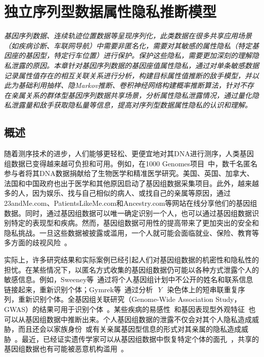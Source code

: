 \chapter{独立序列型数据属性隐私推断模型}
\label{chap:inference-attack-on-norelated-sequenced-data}

\textit{ }

\textit{基因序列数据、连续轨迹位置数据等呈现序列化，此类数据在很多共享应用场景（如疾病诊断、车联网导航）中需要非匿名化，需要对其敏感的属性隐私（特定基因座的基因型，特定行车位置）进行保护。保护这些隐私，需要更加深刻的理解隐私泄露的原因。本章针对基因序列数据的基因座值属性隐私，通过对单条敏感数据记录属性值存在的相互关联关系进行分析，构建目标属性值推断的敌手模型，并以此为基础利用抽样、隐Markov推断、卷积神经网络构建概率推断算法，针对不存在亲属关系的群体型基因序列数据共享场景，分析属性隐私泄露情况，通过量化隐私泄露量和敌手获取隐私量等信息，提高对序列型数据属性隐私的认识和理解。
}

\section{概述}\label{sec:intro}

随着测序技术的进步，人们能够更轻松、更便宜地对其DNA进行测序，人类基因组数据已变得越来越可负担和可用。例如，在1000 Genomes项目~\cite{gpc2015global}中，数千名匿名参与者将其DNA数据捐献给了生物医学和精准医学研究。美国、英国、加拿大、法国和中国政府也出于医学和其他原因启动了基因组数据采集项目。此外，越来越多的人，因为娱乐、找与自己相似的病人、或找自己的亲属等原因，通过23andMe.com、PatientsLikeMe.com和Ancestry.com等网站在线分享他们的基因组数据。同时，通过基因组数据可以唯一确定识别一个人，也可以通过基因组数据识别特定的表现型和疾病。然而，基因组数据可用性的提高带来了更加突出的安全和隐私挑战。一旦这些数据被披露或滥用，一个人就可能会面临就业、保险、教育等多方面的歧视风险~\cite{eeoc2008genetic}。

实际上，许多研究结果和实际案例已经引起人们对基因组数据的机密性和隐私性的担忧。在某些情况下，以匿名方式收集的基因组数据仍可能以各种方式泄露个人的敏感信息。例如，Sweeney等~\cite{sweeney2013identifying}通过将个人基因组计划中不公开的姓名和联系信息链接起来，重新识别个体；Gymrek等~\cite{gymrek2013identifying}通过分析~$~Y~$~染色体上的短串联重复序列，重新识别个体。全基因组关联研究（Genome-Wide Association Study，GWAS）的结果可用于识别个体~\cite{cai2015deterministic}。某些疾病的易感性~\cite{shringarpure2015privacy}和基因表现型外观特征~\cite{walsh2011irisplex}也可以从基因组数据中推断出来。个人基因组数据的泄露不仅会对其个人隐私造成威胁，而且还会以家族身份~\cite{rohlfs2012familial}或有关亲属基因型信息的形式对其亲属的隐私造成威胁~\cite{humbert2013addressing}。最近，已经证实遗传学家可以从基因组数据中恢复特定个体的面孔~\cite{hess2017controversial}，共享的基因组数据也有可能被恶意机构滥用~\cite{scutti2018what}。

